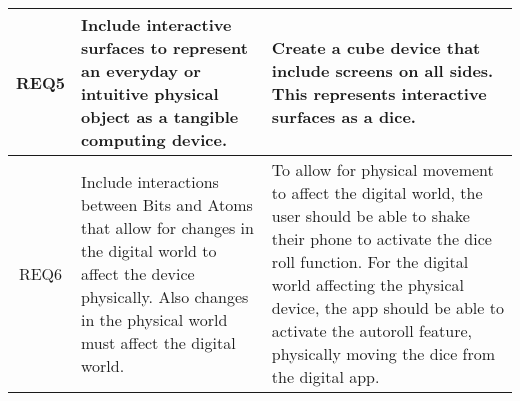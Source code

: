 \begin{xltabular}[H]{\textwidth}{c | X | X}
    \midrule

    REQ5

    &

    Include interactive surfaces to represent an everyday or intuitive physical object as a tangible computing device. 

    &

    Create a cube device that include screens on all sides. This represents interactive surfaces as a dice.\\

 \midrule

    REQ6

    &

   Include interactions between Bits and Atoms that allow for changes in the digital world to affect the device physically. Also changes in the physical world must affect the digital world. 

    &

   To allow for physical movement to affect the digital world, the user should be able to shake their phone to activate the dice roll function. For the digital world affecting the physical device, the app should be able to activate the autoroll feature, physically moving the dice from the digital app.\\

\end{xltabular}
\label{tbl:func_reqs_table}
